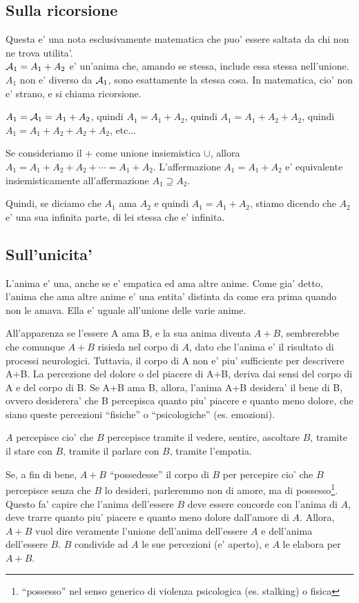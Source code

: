 \subsection{Sulla ricorsione}

Questa e' una nota esclusivamente matematica che puo' essere saltata da chi non ne trova utilita'.\\

$\mathcal{A}_1=A_1+A_2$ e' un'anima che, amando se stessa, include essa stessa nell'unione. $A_1$ non e' diverso da $\mathcal{A}_1$, sono esattamente la stessa cosa. In matematica, cio' non e' strano, e si chiama ricorsione. 

$A_1=\mathcal{A}_1=A_1+A_2$, quindi $A_1=A_1+A_2$, quindi $A_1=A_1+A_2+A_2$, quindi $A_1=A_1+A_2+A_2+A_2$, etc...

Se consideriamo il $+$ come unione insiemistica $\cup$, allora $A_1=A_1+A_2+A_2+\cdots = A_1+A_2$. L'affermazione $A_1=A_1+A_2$ e' equivalente insiemisticamente all'affermazione $A_1 \supseteq A_2$.

Quindi, se diciamo che $A_1$ ama $A_2$ e quindi $A_1=A_1+A_2$, stiamo dicendo che $A_2$ e' una sua infinita parte, di lei stessa che e' infinita.

\subsection{Sull'unicita'}

L'anima e' una, anche se e' empatica ed ama altre anime. Come gia' detto, l'anima che ama altre anime e' una entita' distinta da come era prima quando non le amava. Ella e' uguale all'unione delle varie anime. 

All'apparenza se l'essere A ama B, e la sua anima diventa $A+B$, sembrerebbe che comunque $A+B$ risieda nel corpo di $A$, dato che l'anima e' il risultato di processi neurologici. Tuttavia, il corpo di A non e' piu' sufficiente per descrivere A+B. La percezione del dolore o del piacere di A+B, deriva dai sensi del corpo di A e del corpo di B. Se A+B ama B, allora, l'anima A+B desidera' il bene di B, ovvero desiderera' che B percepisca quanto piu' piacere e quanto meno dolore, che siano queste percezioni ``fisiche'' o ``psicologiche'' (es. emozioni). 

$A$ percepisce cio' che  $B$ percepisce tramite il vedere, sentire, ascoltare $B$, tramite il stare con $B$, tramite il parlare con $B$, tramite l'empatia.

Se, a fin di bene, $A+B$ ``possedesse'' il corpo di $B$ per percepire cio' che $B$ percepisce senza che $B$ lo desideri, parleremmo non di amore, ma di possesso\footnote{``possesso'' nel senso generico di violenza psicologica (es. stalking) o fisica}. Questo fa' capire che l'anima dell'essere $B$ deve essere concorde con l'anima di $A$, deve trarre quanto piu' piacere e quanto meno dolore dall'amore di $A$. Allora, $A+B$ vuol dire veramente l'unione dell'anima dell'essere $A$ e dell'anima dell'essere $B$. $B$ condivide ad $A$ le sue percezioni (e' aperto), e $A$ le elabora per $A+B$. 

